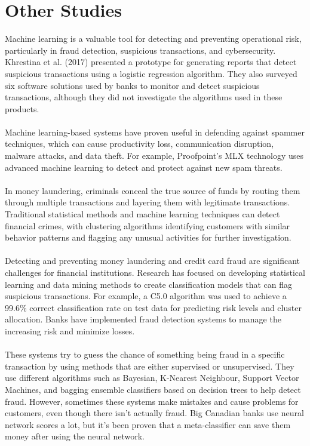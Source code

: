 \section{Other Studies}
Machine learning is a valuable tool for detecting and preventing operational risk, particularly in fraud detection, 
suspicious transactions, and cybersecurity. Khrestina et al. (2017) presented a prototype for generating reports 
that detect suspicious transactions using a logistic regression algorithm. They also surveyed six software 
solutions used by banks to monitor and detect suspicious transactions, although they did not investigate the 
algorithms used in these products.\\\\
Machine learning-based systems have proven useful in defending against spammer techniques, which can cause 
productivity loss, communication disruption, malware attacks, and data theft. For example, Proofpoint's MLX 
technology uses advanced machine learning to detect and protect against new spam threats.\\\\
In money laundering, criminals conceal the true source of funds by routing them through multiple transactions and 
layering them with legitimate transactions. Traditional statistical methods and machine learning techniques can 
detect financial crimes, with clustering algorithms identifying customers with similar behavior patterns and 
flagging any unusual activities for further investigation.\\\\
Detecting and preventing money laundering and credit card fraud are significant challenges for financial 
institutions. Research has focused on developing statistical learning and data mining methods to create 
classification models that can flag suspicious transactions. For example, a C5.0 algorithm was used to 
achieve a 99.6\% correct classification rate on test data for predicting risk levels and cluster allocation. 
Banks have implemented fraud detection systems to manage the increasing risk and minimize losses.\\\\
These systems try to guess the chance of something being fraud in a specific transaction by using methods 
that are either supervised or unsupervised. They use different algorithms such as Bayesian, K-Nearest Neighbour, 
Support Vector Machines, and bagging ensemble classifiers based on decision trees to help detect fraud. However, 
sometimes these systems make mistakes and cause problems for customers, even though there isn't actually fraud. 
Big Canadian banks use neural network scores a lot, but it's been proven that a meta-classifier can save them money 
after using the neural network.

